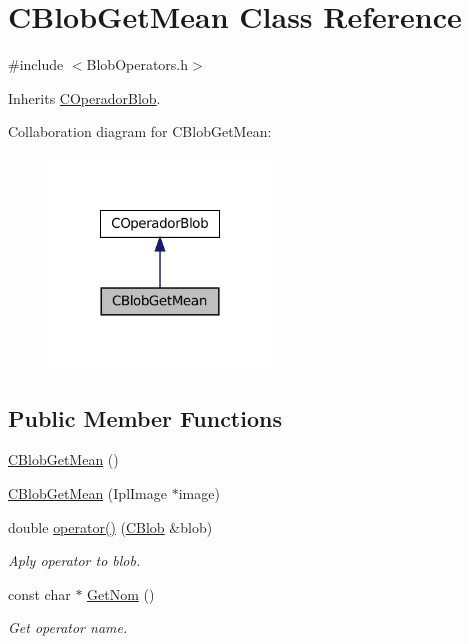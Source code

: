 \hypertarget{class_c_blob_get_mean}{
\section{CBlobGetMean Class Reference}
\label{class_c_blob_get_mean}
}


{\ttfamily \#include $<$BlobOperators.h$>$}



Inherits \hyperlink{class_c_operador_blob}{COperadorBlob}.



Collaboration diagram for CBlobGetMean:
\nopagebreak
\begin{figure}[H]
\begin{center}
\leavevmode
\includegraphics[width=168pt]{class_c_blob_get_mean__coll__graph}
\end{center}
\end{figure}
\subsection*{Public Member Functions}
\begin{DoxyCompactItemize}
\item 
\hyperlink{class_c_blob_get_mean_ac79368faad6b088d11fe864e473bc00a}{CBlobGetMean} ()
\item 
\hyperlink{class_c_blob_get_mean_ae77b75cea8c5c87b7ed1eb17544e8775}{CBlobGetMean} (IplImage $\ast$image)
\item 
double \hyperlink{class_c_blob_get_mean_ad1aff39c601989402d096fb649b9703c}{operator()} (\hyperlink{class_c_blob}{CBlob} \&blob)
\begin{DoxyCompactList}\small\item\em Aply operator to blob. \item\end{DoxyCompactList}\item 
const char $\ast$ \hyperlink{class_c_blob_get_mean_a1992d893f77cf9be2fc6d3521fd51639}{GetNom} ()
\begin{DoxyCompactList}\small\item\em Get operator name. \item\end{DoxyCompactList}\end{DoxyCompactItemize}


